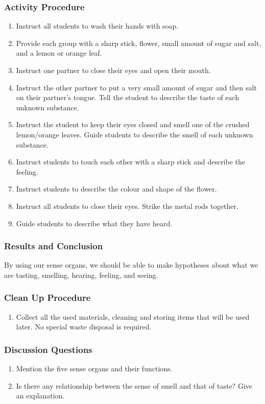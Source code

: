 \subsubsection*{Activity Procedure}
\begin{enumerate}
\item{Instruct all students to wash their hands with soap.}
\item{Provide each group with a sharp stick, flower, small amount of sugar and salt, and a lemon or orange leaf.}
\item{Instruct one partner to close their eyes and open their mouth.}
\item{Instruct the other partner to put a very small amount of sugar and then salt on their partner's tongue. Tell the student to describe the taste of each unknown substance.}
\item{Instruct the student to keep their eyes closed and smell one of the crushed lemon/orange leaves. Guide students to describe the smell of each unknown substance.}
\item{Instruct students to touch each other with a sharp stick and describe the feeling.}
\item{Instruct students to describe the colour and shape of the flower.}
\item{Instruct all students to close their eyes. Strike the metal rods together.}
\item{Guide students to describe what they have heard.}
\end{enumerate}

\subsubsection*{Results and Conclusion}
By using our sense organs, we should be able to make hypotheses about what we are tasting, smelling, hearing, feeling, and seeing.

\subsubsection*{Clean Up Procedure}
\begin{enumerate}
\item{Collect all the used materials, cleaning and storing items that will be used later. No special waste disposal is required.}
\end{enumerate}

\subsubsection*{Discussion Questions}
\begin{enumerate}
\item{Mention the five sense organs and their functions.}
\item{Is there any relationship between the sense of smell and that of taste? Give an explanation.}
\end{enumerate}
